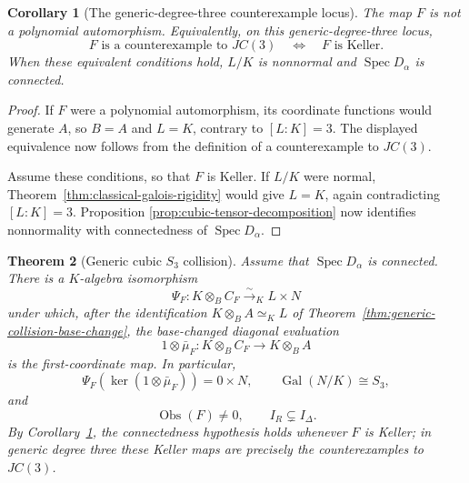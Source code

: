 \documentclass[11pt]{article}
\newtheorem{theorem}{Theorem}[section]
\newtheorem{corollary}[theorem]{Corollary}
\theoremstyle{remark}
\DeclareMathOperator{\Spec}{Spec}
\DeclareMathOperator{\Gal}{Gal}
\newcommand{\Obs}{\operatorname{Obs}}
\begin{document}
\begin{corollary}[The generic-degree-three counterexample locus]
\label{cor:cubic-counterexample-locus}
The map \(F\) is not a polynomial automorphism.  Equivalently, on this
generic-degree-three locus,
\[
  F\text{ is a counterexample to }JC(3)
  \quad\Longleftrightarrow\quad
  F\text{ is Keller}.
\]
When these equivalent conditions hold, \(L/K\) is nonnormal and
\(\Spec D_\alpha\) is connected.
\end{corollary}

\begin{proof}
If \(F\) were a polynomial automorphism, its coordinate functions would
generate \(A\), so \(B=A\) and \(L=K\), contrary to \([L:K]=3\).
The displayed equivalence now follows from the definition of a
counterexample to \(JC(3)\).

Assume these conditions, so that \(F\) is Keller.  If \(L/K\) were
normal, Theorem~\ref{thm:classical-galois-rigidity} would give \(L=K\),
again contradicting \([L:K]=3\).  Proposition
\ref{prop:cubic-tensor-decomposition} now identifies nonnormality with
connectedness of \(\Spec D_\alpha\).
\end{proof}

\begin{theorem}[Generic cubic \(S_3\) collision]
\label{thm:cubic-s3-collision}
Assume that \(\Spec D_\alpha\) is connected.  There is a \(K\)-algebra
isomorphism
\[
  \Psi_F\colon K\otimes_BC_F\xrightarrow{\sim}_K L\times N
\]
under which, after the identification \(K\otimes_BA\simeq_K L\) of
Theorem~\ref{thm:generic-collision-base-change}, the base-changed diagonal
evaluation
\[
  1\otimes\bar\mu_F
  \colon K\otimes_BC_F\longrightarrow K\otimes_BA
\]
is the first-coordinate map.  In particular,
\[
  \Psi_F\!\left(
    \ker(1\otimes\bar\mu_F)
  \right)
  =0\times N,
  \qquad
  \Gal(N/K)\cong S_3,
\]
and
\[
  \Obs(F)\neq0,
  \qquad
  I_R\subsetneq I_\Delta.
\]
By Corollary~\ref{cor:cubic-counterexample-locus}, the connectedness
hypothesis holds whenever \(F\) is Keller; in generic degree three these
Keller maps are precisely the counterexamples to \(JC(3)\).
\end{theorem}
\end{document}
